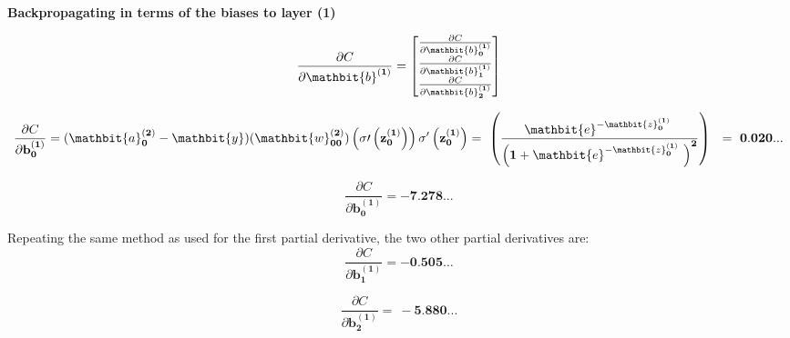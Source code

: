 \documentclass[12pt,a4paper]{article}
\begin{document}
\hspace{}

\textbf{Backpropagating in terms of the biases to layer (1)}

\begin{equation}
\frac{\partial C}{\partial\mathbit{b}^{\left(\mathbf{1}\right)}}=\left[\begin{matrix}\frac{\partial C}{\partial\mathbit{b}_\mathbf{0}^{\left(\mathbf{1}\right)}}\\\frac{\partial C}{\partial\mathbit{b}_\mathbf{1}^{\left(\mathbf{1}\right)}}\\\frac{\partial C}{\partial\mathbit{b}_\mathbf{2}^{\left(\mathbf{1}\right)}}\\\end{matrix}\right]
\end{equation}


\begin{equation}
	\frac{\partial C}{\partial\mathbf{b}_\mathbf{0}^{\left(\mathbf{1}\right)}}={(\mathbit{a}}_\mathbf{0}^{\left(\mathbf{2}\right)}-\mathbit{y})(\mathbit{w}_{\mathbf{00}}^{\left(\mathbf{2}\right)})\left(\mathbf{\sigma}\prime\left(\mathbf{z}_\mathbf{0}^{\left(\mathbf{1}\right)}\right)\right)
\mathbf{\sigma}^\prime\left(\mathbf{z}_\mathbf{0}^{\left(\mathbf{1}\right)}\right)=\ \left(\frac{\mathbit{e}^{-\mathbit{z}_\mathbf{0}^{\left(\mathbf{1}\right)}\ }}{\left(\mathbf{1}+\mathbit{e}^{-\mathbit{z}_\mathbf{0}^{\left(\mathbf{1}\right)}\ }\right)^\mathbf{2}}\right)\ \ =\ \mathbf{0}.\mathbf{020}...
\end{equation}

\begin{equation}
\frac{\partial C}{\partial\mathbf{b}_\mathbf{0}^{\left(\mathbf{1}\right)}}=-\mathbf{7}.\mathbf{278}...	
\end{equation}


Repeating the same method as used for the first partial derivative, the two other partial derivatives are:
\begin{equation}
\frac{\partial C}{\partial\mathbf{b}_\mathbf{1}^{\left(\mathbf{1}\right)}}=-\mathbf{0}.\mathbf{505}\ldots
\end{equation}

\begin{equation}
\frac{\partial C}{\partial\mathbf{b}_\mathbf{2}^{\left(\mathbf{1}\right)}}=\ -\mathbf{5}.\mathbf{880}...
\end{equation}
\end{document}
